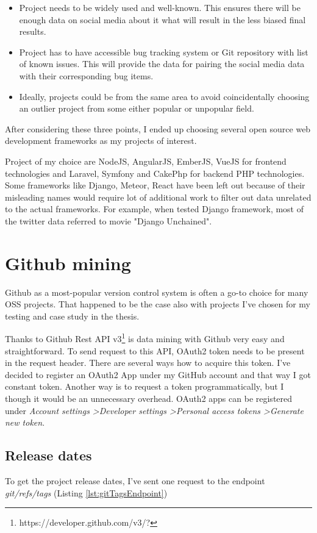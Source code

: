 \begin{itemize}
  \item Project needs to be widely used and well-known. This ensures there will be enough data on social media about it what will result in the less biased final results.
  \item Project has to have accessible bug tracking system or Git repository with list of known issues. This will provide the data for pairing the social media data with their corresponding bug items.
  \item Ideally, projects could be from the same area to avoid coincidentally choosing an outlier project from some either popular or unpopular field.
\end{itemize}

After considering these three points, I ended up choosing several open source web development frameworks as my projects of interest. 

Project of my choice are NodeJS, AngularJS, EmberJS, VueJS for frontend technologies and Laravel, Symfony and CakePhp for backend PHP technologies. Some frameworks like Django, Meteor, React have been left out because of their misleading names  would require lot of additional work to filter out data unrelated to the actual frameworks. For example, when tested Django framework, most of the twitter data referred to movie "Django Unchained".

\section{Github mining}
Github as a most-popular version control system is often a go-to choice for many OSS projects. That happened to be the case also with projects I've chosen for my testing and case study in the thesis.

Thanks to Github Rest API v3\footnote{https://developer.github.com/v3/?} is data mining with Github very easy and straightforward. To send request to this API, OAuth2 token needs to be present in the request header. There are several ways how to acquire this token. I've decided to register an OAuth2 App under my GitHub account and that way I got constant token. Another way is to request a token programmatically, but I though it would be an unnecessary overhead. OAuth2 apps can be registered under \textit{Account settings \textgreater Developer settings \textgreater Personal access tokens \textgreater Generate new token}.
\subsection{Release dates} \label{ssec:gitReleaseDatesMining}
To get the project release dates, I've sent one request to the endpoint \textit{git/refs/tags} (Listing \ref{lst:gitTagsEndpoint})

